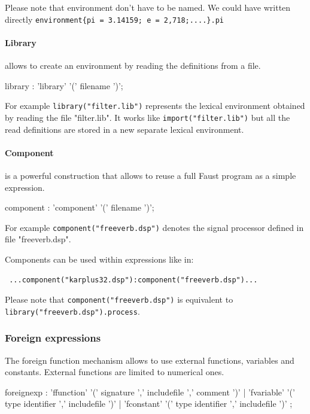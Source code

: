 \documentclass{article}
\begin{document}
Please note that environment don't have to be named. We could have written directly 
\lstinline'environment{pi = 3.14159; e = 2,718;....}.pi'



\paragraph{Library} allows to create an environment by reading the definitions from a file.

\begin{rail}
library :    'library' '(' filename ')';
\end{rail}

For example \lstinline'library("filter.lib")' represents the lexical environment 
obtained by reading the file "filter.lib". It works like \lstinline'import("filter.lib")' but all the read definitions are stored in a new separate lexical environment.


\paragraph{Component} is a powerful construction that allows to reuse a full Faust program as a simple expression.

\begin{rail}
component :    'component' '(' filename ')';
\end{rail}

 For example \lstinline'component("freeverb.dsp")' denotes the signal processor defined in file "freeverb.dsp". 
 
 Components can be used within expressions like in: 
 \begin{lstlisting}
 ...component("karplus32.dsp"):component("freeverb.dsp")... 
 \end{lstlisting}
 
 Please note that \lstinline'component("freeverb.dsp")' is equivalent to \lstinline'library("freeverb.dsp").process'.


\subsubsection{Foreign expressions}

The foreign function mechanism allows to use external functions, variables and constants. External functions are limited to numerical ones. 
 
\begin{rail}
foreignexp : 'ffunction' '(' signature ',' includefile ',' comment ')' 
          | 'fvariable' '(' type identifier ',' includefile ')' 
          | 'fconstant' '(' type identifier ',' includefile ')' ;
\end{rail}
  
\end{document}
